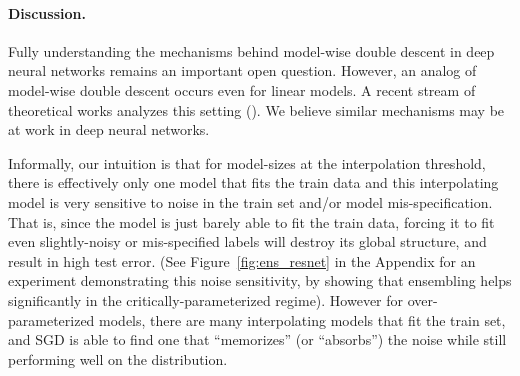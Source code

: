 





\paragraph{Discussion.}
Fully understanding the mechanisms behind model-wise double descent
in deep neural networks remains an important open question.
However, an analog of model-wise double descent occurs even
for linear models. A recent stream of theoretical works
analyzes this setting
(\cite{bartlett2019benign,muthukumar2019harmless,belkin2019two,mei2019generalization,hastie2019surprises}).
We believe similar mechanisms may be at work in deep neural networks.

Informally, our intuition is that for model-sizes at the interpolation threshold, there is effectively
only one model that fits the train data and this interpolating model is very sensitive
to noise in the train set and/or model mis-specification.
That is, since the model is just barely able to fit the train data,
forcing it to fit even slightly-noisy or mis-specified
labels will destroy its global structure, and result in high test error.
(See Figure~\ref{fig:ens_resnet} in the Appendix for an experiment
demonstrating this noise sensitivity, by showing that ensembling helps significantly
in the critically-parameterized regime).
However for over-parameterized models,
there are many interpolating models that fit the train set,
and SGD is able to find one that ``memorizes''
(or ``absorbs'') the noise while still performing well on the distribution.

